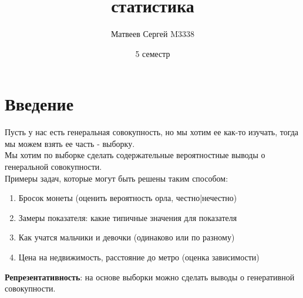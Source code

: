 \documentclass{article}
\title{\hugeМатематическая статистика}
\author{Матвеев Сергей M3338}
\date{5 семестр}
\newcommand\0{\mathbb{0}}
\newcommand\1{\mathbb{1}}
\begin{document}
\maketitle

\section{Введение}
Пусть у нас есть генеральная совокупность, но мы хотим ее как-то изучать, тогда мы можем взять ее часть - выборку.\\
Мы хотим по выборке сделать содержательные вероятностные выводы о генеральной совокупности.\\
Примеры задач, которые могут быть решены таким способом:\\
\begin{enumerate}
    \item Бросок монеты (оценить вероятность орла, честно|нечестно)
    \item Замеры показателя: какие типичные значения для показателя
    \item Как учатся мальчики и девочки (одинаково или по разному)
    \item Цена на недвижимость, расстояние до метро (оценка зависимости)
\end{enumerate}
\textbf{Репрезентативность}: на основе выборки можно сделать выводы о генеративной совокупности.
\end{document}
